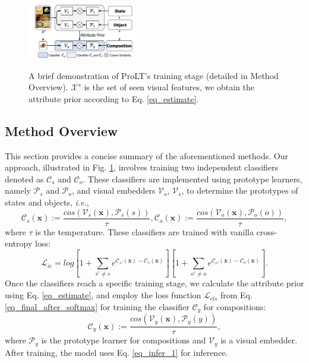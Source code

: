 \documentclass[letterpaper]{article} %
\newcommand{\mx}{\mathbf{x}}
\newcommand{\ie}{\textit{i.e.}}
\theoremstyle{definition}
\begin{document}
	\begin{figure}[t]
		\centering
		\subfigure
		{
			\includegraphics[width=0.42\textwidth]{ fig_method.pdf}
		}
		\caption{A brief demonstration of ProLT's training stage (detailed in Method Overview). $\mathcal{X}^s$ is the set of seen visual features, we obtain the attribute prior according to Eq. \ref{eq_estimate}.}
        
		\label{fig_method}
	\end{figure}

\subsection{Method Overview}\label{subsec.overview}
This section provides a concise summary of the aforementioned methods. Our approach, illustrated in Fig. \ref{fig_method}, involves training two independent classifiers denoted as $\mathcal{C}_{s}$ and $\mathcal{C}_{o}$. These classifiers are implemented using prototype learners, namely $\mathcal{P}_{s}$ and $\mathcal{P}_{o}$, and visual embedders $\mathcal{V}_{o}$, $\mathcal{V}_{s}$, to determine the prototypes of states and objects, \ie,
\begin{equation}
\mathcal{C}_{s}(\mx):=\frac{cos(\mathcal{V}_{s}(\mx),\mathcal{P}_{s}(s))}{\tau},\mathcal{C}_{o}(\mx):=\frac{cos(\mathcal{V}_{o}(\mx),\mathcal{P}_{o}(o))}{\tau},
        \label{eq_prototype}
	\end{equation}
where $\tau$ is the temperature. These classifiers are trained with vanilla cross-entropy loss:
\begin{equation}
\mathcal{L}_{ic}= log[1+\sum_{s'\neq s}e^{\mathcal{C}_{s'}(\mx)-\mathcal{C}_{s}(\mx)} ][1+\sum_{o'\neq o}e^{\mathcal{C}_{o'}(\mx)-\mathcal{C}_{o}(\mx)} ].
        \label{eq_ce}
	\end{equation}
Once the classifiers reach a specific training stage, we calculate the attribute prior using Eq. \ref{eq_estimate}, and employ the loss function $\mathcal{L}_{cls}$ from Eq. \ref{eq_final_after_softmax} for training the classifier $\mathcal{C}_{y}$ for compositions:
\begin{equation}
\mathcal{C}_{y}(\mx):=\frac{cos(\mathcal{V}_{y}(\mx),\mathcal{P}_{y}(y))}{\tau},
        \label{eq_prototype_common}
	\end{equation}
where $\mathcal{P}_{y}$ is the prototype learner for compositions and $\mathcal{V}_{y}$ is a visual embedder. After training, the model uses Eq. \ref{eq_infer_1} for inference.
\end{document}
